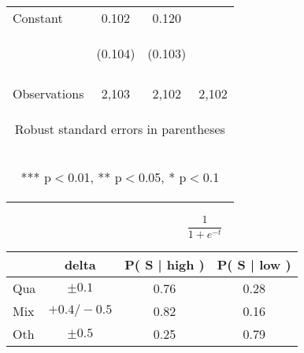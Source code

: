\documentclass{article} %
\begin{document}
\begin{table}[H]
\begin{center}
\begin{tabular}{lccc}
Constant & 0.102 & 0.120 &  \\
 & \begin{footnotesize}(0.104)\end{footnotesize} & \begin{footnotesize}(0.103)\end{footnotesize} & \begin{footnotesize}\end{footnotesize} \\
\vspace{4pt} & \begin{footnotesize}\end{footnotesize} & \begin{footnotesize}\end{footnotesize} & \begin{footnotesize}\end{footnotesize} \\
 Observations & 2,103 & 2,102 & 2,102 \\ \hline
\multicolumn{4}{c}{\begin{footnotesize} Robust standard errors in parentheses\end{footnotesize}} \\
\multicolumn{4}{c}{\begin{footnotesize} *** p$<$0.01, ** p$<$0.05, * p$<$0.1\end{footnotesize}} \\
\end{tabular}
\end{center}

\end{table}

\clearpage
$$\frac{1}{1+e^{-t}}$$

\begin{table}[H]
\begin{center}
\begin{tabular}{l | ccc} 
             & delta & P( S | high ) & P( S | low ) \\ \hline
Qua &  $\pm 0.1$ & 0.76 & 0.28 \\ 
Mix &  $+0.4/-0.5$ & 0.82 & 0.16 \\ 
Oth &  $\pm 0.5$ & 0.25 & 0.79 \\ 

\end{tabular}
\end{center}
\end{table}
\end{document}
